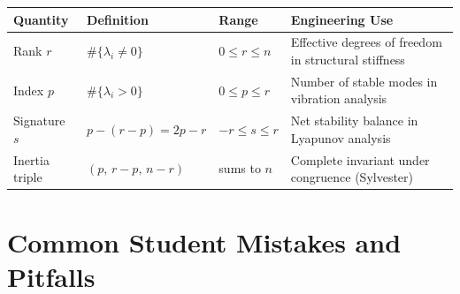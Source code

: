 \documentclass[12pt,a4paper]{article}
\begin{document}
\bigskip
\begin{center}
\begin{tabular}{@{}p{2.8cm} p{3.0cm} p{3.0cm} p{3.5cm}@{}}
\toprule
\textbf{Quantity} & \textbf{Definition} & \textbf{Range} & \textbf{Engineering Use} \\
\midrule
Rank \(r\) &
  \(\#\{\lambda_i \neq 0\}\) &
  \(0 \leq r \leq n\) &
  Effective degrees of freedom in structural stiffness \\
\addlinespace
Index \(p\) &
  \(\#\{\lambda_i > 0\}\) &
  \(0 \leq p \leq r\) &
  Number of stable modes in vibration analysis \\
\addlinespace
Signature \(s\) &
  \(p - (r-p) = 2p - r\) &
  \(-r \leq s \leq r\) &
  Net stability balance in Lyapunov analysis \\
\addlinespace
Inertia triple &
  \((p,\, r-p,\, n-r)\) &
  sums to \(n\) &
  Complete invariant under congruence (Sylvester) \\
\bottomrule
\end{tabular}
\end{center}

\section{Common Student Mistakes and Pitfalls}
\end{document}
